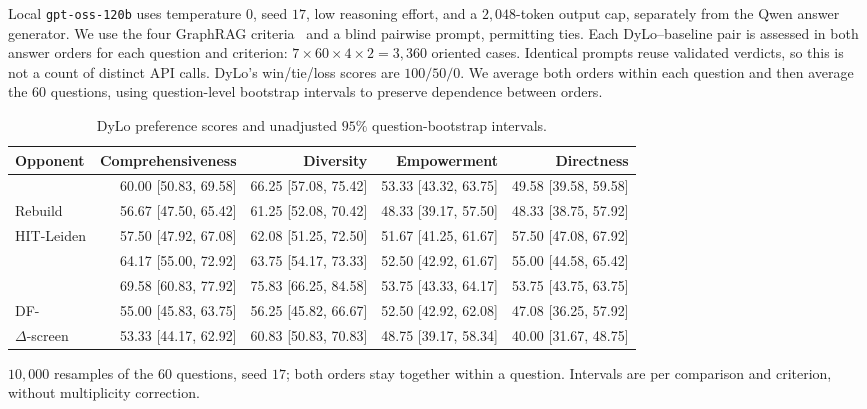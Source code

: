  Local \texttt{gpt-oss-120b}
uses temperature $0$, seed $17$, low reasoning effort, and a $2{,}048$-token
output cap, separately from the Qwen answer generator. We use the four
GraphRAG criteria~\cite{edge2024graphrag} and a blind pairwise prompt, permitting
ties. Each DyLo--baseline pair is assessed in both answer orders for each
question and criterion: $7\times60\times4\times2=3{,}360$ oriented cases.
Identical prompts reuse validated verdicts, so this is not a count of distinct
API calls. DyLo's win/tie/loss scores are $100/50/0$. We average both orders
within each question and then average the $60$ questions, using question-level
bootstrap intervals to preserve dependence between orders.
\begin{table}[tb]\centering
\caption{DyLo preference scores and unadjusted $95\%$ question-bootstrap intervals.}
\label{tab:sensemaking-ci}
\footnotesize
\setlength{\tabcolsep}{0.25em}
\begin{tabular*}{\linewidth}{@{\extracolsep{\fill}}lrrrr@{}}
\toprule
Opponent & Comprehensiveness & Diversity & Empowerment & Directness \\
\midrule
\Batch{} & 60.00 [50.83, 69.58] & 66.25 [57.08, 75.42] & 53.33 [43.32, 63.75] & 49.58 [39.58, 59.58] \\
Rebuild & 56.67 [47.50, 65.42] & 61.25 [52.08, 70.42] & 48.33 [39.17, 57.50] & 48.33 [38.75, 57.92] \\
HIT-Leiden & 57.50 [47.92, 67.08] & 62.08 [51.25, 72.50] & 51.67 [41.25, 61.67] & 57.50 [47.08, 67.92] \\
\DynaMo{} & 64.17 [55.00, 72.92] & 63.75 [54.17, 73.33] & 52.50 [42.92, 61.67] & 55.00 [44.58, 65.42] \\
\QCA{} & 69.58 [60.83, 77.92] & 75.83 [66.25, 84.58] & 53.75 [43.33, 64.17] & 53.75 [43.75, 63.75] \\
DF-\Louvain{} & 55.00 [45.83, 63.75] & 56.25 [45.82, 66.67] & 52.50 [42.92, 62.08] & 47.08 [36.25, 57.92] \\
$\Delta$-screen & 53.33 [44.17, 62.92] & 60.83 [50.83, 70.83] & 48.75 [39.17, 58.34] & 40.00 [31.67, 48.75] \\
\bottomrule
\end{tabular*}
\par\smallskip\raggedright
$10{,}000$ resamples of the $60$ questions, seed $17$; both orders stay together within a question. Intervals are per comparison and criterion, without multiplicity correction.
\end{table}

